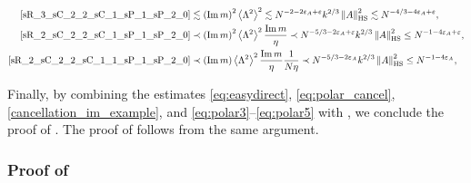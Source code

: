 \documentclass[10pt,reqno]{amsart}
\numberwithin{equation}{section}
\numberwithin{figure}{section}
\theoremstyle{plain} %
\theoremstyle{definition} %
\renewcommand{\txt}[1]{\text{\rm{#1}}}
\renewcommand{\leq}{\le}
\newcommand{\pa}[1]{\left({#1}\right)}
\newcommand{\norma}[1]{\left\lVert #1 \right\rVert}
\newcommand{\avga}[1]{\left\langle #1 \right\rangle}
\DeclareMathOperator{\im}{\mathrm{Im}}
\newcommand{\HS}{\txt{HS}}
\numberwithin{equation}{section}
\begin{document}
      \begin{align}\label{eq:polar3}
              \eqref{sR_3_sC_2_2_sC_1_sP_1_sP_2_0}&\lesssim \pa{\im m}^2\avga{\Lambda^2}^2\lesssim N^{-2-2\varepsilon_A+\varepsilon}k^{2/3}\norma{A}_{\HS}^2\lesssim N^{-4/3-4\varepsilon_A+\varepsilon},\\
 \label{eq:polar4}
 \eqref{sR_2_sC_2_2_sC_1_sP_1_sP_2_0}&\prec {\pa{\im m}^2\avga{\Lambda^2}^2\frac{ \im m}{\eta}}\prec N^{-5/3-2\varepsilon_A+\varepsilon}k^{2/3}\norma{A}_{\HS}^2\leq N^{-1-4\varepsilon_A+\varepsilon},       \\   
\label{eq:polar5}
	\eqref{sR_2_sC_2_2_sC_1_1_sP_1_sP_2_0}&\prec{(\im m) \avga{\Lambda^2}^2 \frac{\im m}{\eta}\frac{1}{N\eta}}\prec N^{-5/3-2\varepsilon_A}k^{2/3}\norma{A}_{\HS}^2\leq N^{-1-4\varepsilon_A},
          \end{align}

Finally, by combining the estimates \eqref{eq:easydirect}, \eqref{eq:polar_cancel}, \eqref{cancellation_im_example}, and \eqref{eq:polar3}--\eqref{eq:polar5} with , we conclude the proof of . The proof of  follows from the same argument.



    

\subsubsection{Proof of }
\label{subsection:proof_of_claim_estimate_remainder_terms}
\end{document}
